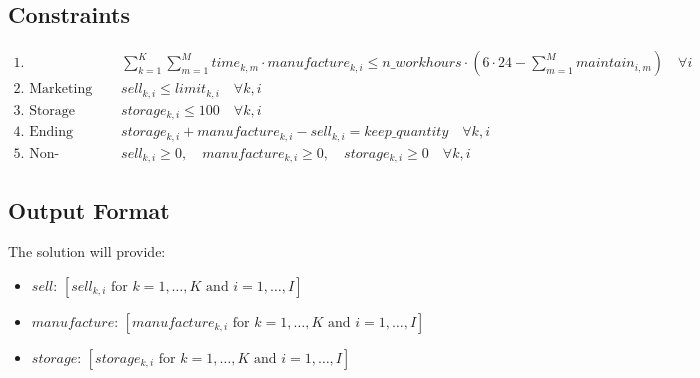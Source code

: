 \documentclass{article}
\begin{document}
\subsection*{Constraints}
\begin{align*}
    \text{1. Production Time Constraint:} & \quad \sum_{k=1}^{K} \sum_{m=1}^{M} time_{k, m} \cdot manufacture_{k, i} \leq n\_workhours \cdot (6 \cdot 24 - \sum_{m=1}^{M} maintain_{i, m}) \quad \forall i \\
    \text{2. Marketing Limitations:} & \quad sell_{k, i} \leq limit_{k, i} \quad \forall k, i \\
    \text{3. Storage Constraint:} & \quad storage_{k, i} \leq 100 \quad \forall k, i \\
    \text{4. Ending Inventory Requirement:} & \quad storage_{k, i} + manufacture_{k, i} - sell_{k, i} = keep\_quantity \quad \forall k, i \\
    \text{5. Non-negativity:} & \quad sell_{k, i} \geq 0, \quad manufacture_{k, i} \geq 0, \quad storage_{k, i} \geq 0 \quad \forall k, i 
\end{align*}

\subsection*{Output Format}
The solution will provide:
\begin{itemize}
    \item $sell$: \([sell_{k, i} \text{ for } k=1,\ldots,K \text{ and } i=1,\ldots,I]\)
    \item $manufacture$: \([manufacture_{k, i} \text{ for } k=1,\ldots,K \text{ and } i=1,\ldots,I]\)
    \item $storage$: \([storage_{k, i} \text{ for } k=1,\ldots,K \text{ and } i=1,\ldots,I]\)
\end{itemize}
\end{document}
